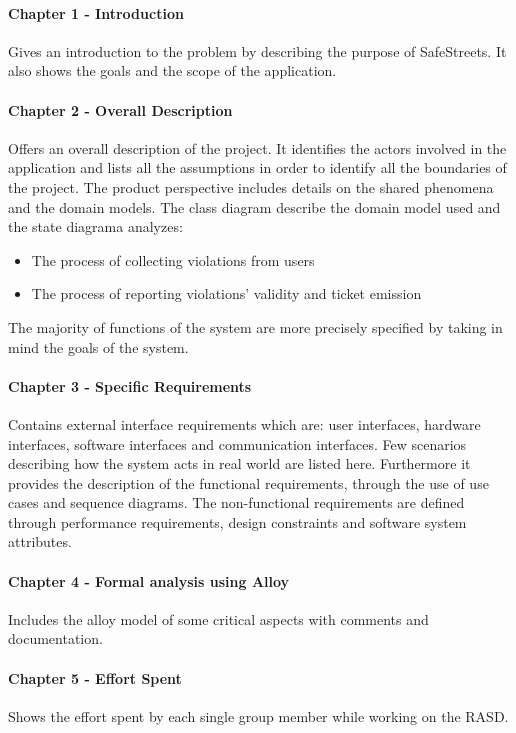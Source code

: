 \documentclass{article}
\begin{document}
\paragraph{Chapter 1 - Introduction}
Gives an introduction to the problem by describing the purpose of SafeStreets.
It also shows the goals and the scope of the application. \paragraph{Chapter 2 -
Overall Description}Offers an overall description of the project. It identifies
the actors involved in the application and lists all the assumptions in order to
identify all the boundaries of the project. The product perspective includes
details on the shared phenomena and the domain models. The class diagram
describe the domain model used and the state diagrama analyzes:
\begin{itemize}
    \item The process of collecting violations from users
    \item The process of reporting violations' validity and ticket emission
\end{itemize}
The majority of functions of the system are more precisely specified by taking
in mind the goals of the system.  
\paragraph{Chapter 3 - Specific Requirements}
Contains external interface requirements which are: user interfaces, hardware
interfaces, software interfaces and communication interfaces. Few scenarios
describing how the system acts in real world are listed here. Furthermore it
provides the description of the functional requirements, through the use of use
cases and sequence diagrams. The non-functional requirements are defined through
performance requirements, design constraints and software system attributes.
\paragraph{Chapter 4 - Formal analysis using Alloy}
Includes the alloy model of some critical aspects with comments and
documentation.
\paragraph{Chapter 5 - Effort Spent}
Shows the effort spent by each single group member while working on the RASD.
\end{document}
